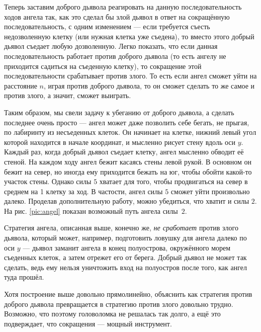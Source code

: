 Теперь заставим доброго дьявола реагировать на данную последовательность ходов ангела так, как это сделал бы злой дьявол в ответ на сокращённую последовательность, с одним изменением --- если требуется съесть недозволенную клетку (или нужная клетка уже съедена), то вместо этого добрый дьявол съедает любую дозволенную.
Легко показать, что если данная последовательность работает против доброго дьявола (то есть ангелу не приходится садиться на съеденную клетку), то сокращение этой последовательности срабатывает против злого.
То есть если ангел сможет уйти на расстояние $n$, играя против доброго дьявола, то он сможет сделать то же самое и против злого, а значит, сможет выиграть.

Таким образом, мы свели задачу к убеганию от доброго дьявола, а сделать последнее очень просто ---
ангел может даже позволить себе бегать, не прыгая, по лабиринту из несъеденных клеток.
Он начинает на клетке, нижний левый угол которой находится в начале координат,
и мысленно рисует стену вдоль оси $y$.
Каждый раз, когда добрый дьявол съедает клетку, ангел мысленно обводит её стеной.
На каждом ходу ангел бежит касаясь стены левой рукой.
В основном он бежит на север, но иногда ему приходится бежать на юг, чтобы обойти какой-то участок стены.
Однако силы $5$ хватает для того, чтобы продвигаться на север в среднем на 1 клетку за ход.
В частости, ангел силы $5$ сможет уйти произвольно далеко.
Проделав дополнительную работу, можно убедиться, что хватит и силы $2$.
На рис. \ref{pic:angel} показан возможный путь ангела силы~$2$.

Стратегия ангела, описанная выше, конечно же, \emph{не сработает} против злого дьявола, который может, например, подготовить ловушку для ангела далеко по оси $y$ --- дьявол заманит ангела в конец полуострова, окружённого морем съеденных клеток, а затем отрежет его от берега.
Добрый дьявол не может так сделать, ведь ему нельзя уничтожить вход на полуостров после того, как ангел туда прошёл.

Хотя построение выше довольно прямолинейно, объяснить как стратегия против доброго дьявола превращается в стратегию против злого довольно трудно.
Возможно, что поэтому головоломка не решалась так долго, а ещё это подверждает, что сокращения --- мощный инструмент.

